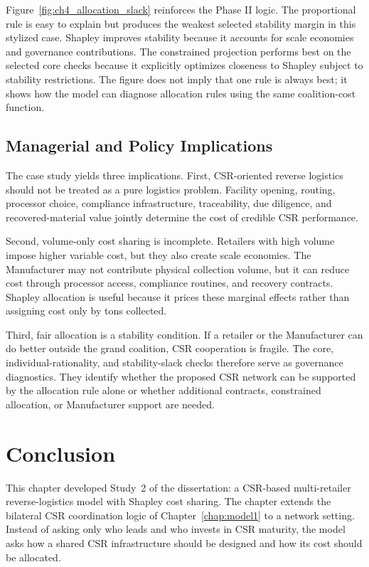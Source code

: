 Figure~\ref{fig:ch4_allocation_slack} reinforces the Phase II logic. The proportional rule is easy to explain but produces the weakest selected stability margin in this stylized case. Shapley improves stability because it accounts for scale economies and governance contributions. The constrained projection performs best on the selected core checks because it explicitly optimizes closeness to Shapley subject to stability restrictions. The figure does not imply that one rule is always best; it shows how the model can diagnose allocation rules using the same coalition-cost function.

\subsection{Managerial and Policy Implications}

The case study yields three implications. First, CSR-oriented reverse logistics should not be treated as a pure logistics problem. Facility opening, routing, processor choice, compliance infrastructure, traceability, due diligence, and recovered-material value jointly determine the cost of credible CSR performance.

Second, volume-only cost sharing is incomplete. Retailers with high volume impose higher variable cost, but they also create scale economies. The Manufacturer may not contribute physical collection volume, but it can reduce cost through processor access, compliance routines, and recovery contracts. Shapley allocation is useful because it prices these marginal effects rather than assigning cost only by tons collected.

Third, fair allocation is a stability condition. If a retailer or the Manufacturer can do better outside the grand coalition, CSR cooperation is fragile. The core, individual-rationality, and stability-slack checks therefore serve as governance diagnostics. They identify whether the proposed CSR network can be supported by the allocation rule alone or whether additional contracts, constrained allocation, or Manufacturer support are needed.

\section{Conclusion}
\label{sec:model_conclusion}

This chapter developed Study~2 of the dissertation: a CSR-based multi-retailer reverse-logistics model with Shapley cost sharing. The chapter extends the bilateral CSR coordination logic of Chapter~\ref{chap:model1} to a network setting. Instead of asking only who leads and who invests in CSR maturity, the model asks how a shared CSR infrastructure should be designed and how its cost should be allocated.


